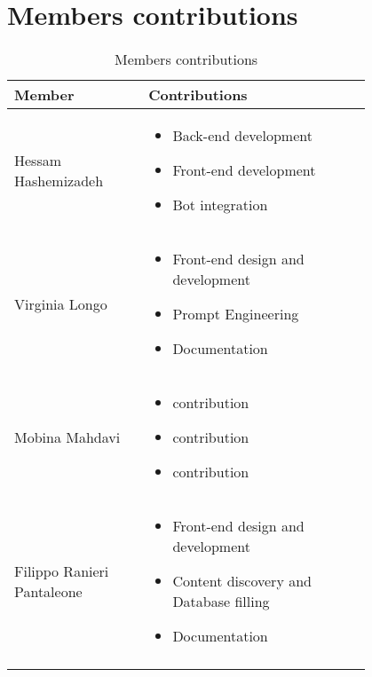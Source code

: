 \chapter{Members contributions}
\begin{longtable}
    {|m{0.3\linewidth}|m{0.5\linewidth}|}
            \hline
            \textbf{Member} & \textbf{Contributions}\\
            \hline
            \endhead
                Hessam Hashemizadeh &
                \begin{itemize}
                    \item Back-end development
                    \item Front-end development
                    \item Bot integration
                \end{itemize} \\
            \hline
                 Virginia Longo &
                 \begin{itemize}
                    \item Front-end design and development
                    \item Prompt Engineering
                    \item Documentation
                \end{itemize} \\
            \hline
                 Mobina Mahdavi &
                 \begin{itemize}
                    \item contribution
                    \item contribution
                    \item contribution
                \end{itemize} \\
            \hline
                Filippo Ranieri Pantaleone &
                \begin{itemize}
                    \item Front-end design and development
                    \item Content discovery and Database filling
                    \item Documentation
                \end{itemize} \\
            \hline
            \caption{Members contributions}
            \label{table:mem_contributions}
\end{longtable}
